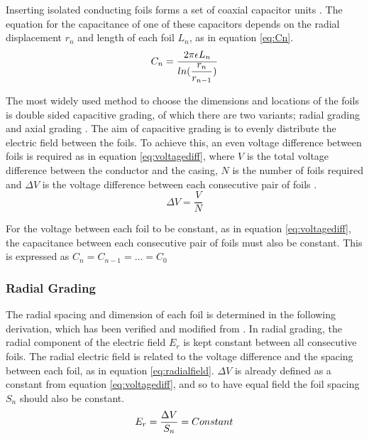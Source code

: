 Inserting isolated conducting foils forms a set of coaxial capacitor units \cite{kuffel2000high}.
The equation for the capacitance of one of these capacitors depends on the radial displacement $r_n$ and length of each foil $L_n$, as in equation \ref{eq:Cn}.
\begin{equation}
   \label{eq:Cn}
   C_n =\displaystyle\displaystyle\frac{2\pi\epsilon L_{n}}{ln(\displaystyle\frac{r_{n}}{r_{n-1}})}
\end{equation}

The most widely used method to choose the dimensions and locations of the foils is double sided capacitive grading, of which there are two variants; radial grading and axial grading \cite{Ahmed11}.
The aim of capacitive grading is to evenly distribute the electric field between the foils.
To achieve this, an even voltage difference between foils is required as in equation \ref{eq:voltagediff}, where $V$ is the total voltage difference between the conductor and the casing, $N$ is the number of foils required and $\Delta V$ is the voltage difference between each consecutive pair of foils \cite{David1}.
\begin{equation}
   \label{eq:voltagediff}
   \Delta V = \displaystyle\frac{V}{N}
\end{equation}

For the voltage between each foil to be constant, as in equation \ref{eq:voltagediff}, the capacitance between each consecutive pair of foils must also be constant. This is expressed as $C_n = C_{n-1} = \dots = C_0$

\subsubsection{Radial Grading} \label{Section:RadialGrading}
The radial spacing and dimension of each foil is determined in the following derivation, which has been verified and modified from \cite{kuffel2000high}.
In radial grading, the radial component of the electric field $E_r$ is kept constant between all consecutive foils.
The radial electric field is related to the voltage difference and the spacing between each foil, as in equation \ref{eq:radialfield}. $\Delta V$ is already defined as a constant from equation \ref{eq:voltagediff}, and so to have equal field the foil spacing $S_n$ should also be constant. 
\begin{equation}
   \label{eq:radialfield}
   E_r = \displaystyle\displaystyle\frac{\Delta V}{S_n} = Constant
\end{equation}

